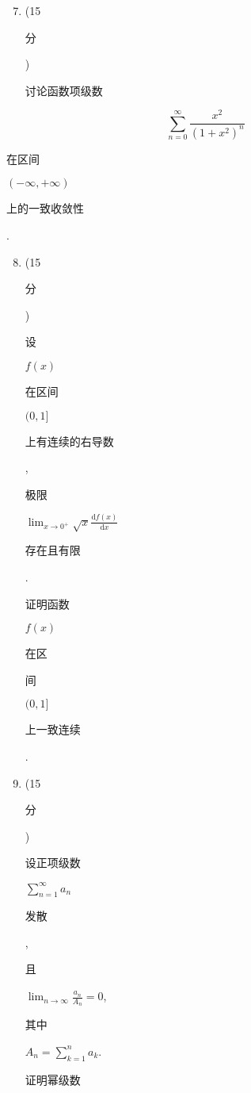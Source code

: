 \documentclass[10pt]{article}
\begin{document}
\begin{enumerate}
  \setcounter{enumi}{6}
  \item (15 \begin{CJK}{UTF8}{mj}分\end{CJK}) \begin{CJK}{UTF8}{mj}讨论函数项级数\end{CJK}
\end{enumerate}
$$
\sum_{n=0}^{\infty} \frac{x^{2}}{\left(1+x^{2}\right)^{n}}
$$
\begin{CJK}{UTF8}{mj}在区间\end{CJK} $(-\infty,+\infty)$ \begin{CJK}{UTF8}{mj}上的一致收敛性\end{CJK}.

\begin{enumerate}
  \setcounter{enumi}{7}
  \item (15 \begin{CJK}{UTF8}{mj}分\end{CJK}) \begin{CJK}{UTF8}{mj}设\end{CJK} $f(x)$ \begin{CJK}{UTF8}{mj}在区间\end{CJK} $(0,1]$ \begin{CJK}{UTF8}{mj}上有连续的右导数\end{CJK}, \begin{CJK}{UTF8}{mj}极限\end{CJK} $\lim _{x \rightarrow 0^{+}} \sqrt{x} \frac{\mathrm{d} f(x)}{\mathrm{d} x}$ \begin{CJK}{UTF8}{mj}存在且有限\end{CJK}. \begin{CJK}{UTF8}{mj}证明函数\end{CJK} $f(x)$ \begin{CJK}{UTF8}{mj}在区\end{CJK} \begin{CJK}{UTF8}{mj}间\end{CJK} $(0,1]$ \begin{CJK}{UTF8}{mj}上一致连续\end{CJK}.

  \item (15 \begin{CJK}{UTF8}{mj}分\end{CJK}) \begin{CJK}{UTF8}{mj}设正项级数\end{CJK} $\sum_{n=1}^{\infty} a_{n}$ \begin{CJK}{UTF8}{mj}发散\end{CJK}, \begin{CJK}{UTF8}{mj}且\end{CJK} $\lim _{n \rightarrow \infty} \frac{a_{n}}{A_{n}}=0$, \begin{CJK}{UTF8}{mj}其中\end{CJK} $A_{n}=\sum_{k=1}^{n} a_{k}$. \begin{CJK}{UTF8}{mj}证明幂级数\end{CJK}

\end{enumerate}
\end{document}
